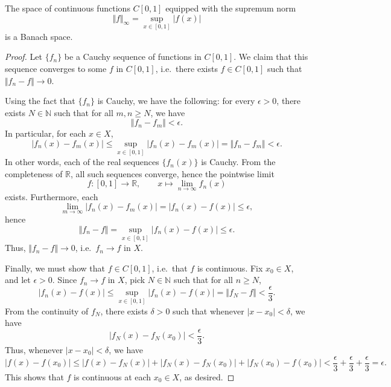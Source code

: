 \documentclass[11pt]{article}
\newcommand{\R}{\mathbb{R}}
\newcommand{\N}{\mathbb{N}}
\newcommand{\norm}[1]{\Vert #1 \Vert}
\theoremstyle{definition}
\theoremstyle{remark}
\begin{document}
    \begin{lemma}
        The space of continuous functions $C[0, 1]$ equipped with the supremum norm \[
            \norm{f}_\infty = \sup_{x \in [0, 1]} |f(x)|
        \] is a Banach space.
    \end{lemma}
    \begin{proof}
        Let $\{f_n\}$ be a Cauchy sequence of functions in $C[0, 1]$. We claim that
        this sequence converges to some $f$ in $C[0, 1]$, i.e.\ there exists $f \in
        C[0, 1]$ such that $\norm{f_n - f} \to 0$.

        Using the fact that $\{f_n\}$ is Cauchy, we have the following: for every
        $\epsilon > 0$, there exists $N \in \N$ such that for all $m, n \geq N$, we
        have \[
            \norm{f_n - f_m} < \epsilon.
        \] In particular, for each $x \in X$, \[
            |f_n(x) - f_m(x)| \leq \sup_{x \in [0, 1]} |f_n(x) - f_m(x)| = \norm{f_n
            - f_m} < \epsilon.
        \] In other words, each of the real sequences $\{f_n(x)\}$ is Cauchy. From
        the completeness of $\R$, all such sequences converge, hence the pointwise
        limit \[
            f\colon [0, 1] \to \R, \qquad x \mapsto \lim_{n \to \infty} f_n(x)
        \] exists. Furthermore, each \[
            \lim_{m \to \infty} |f_n(x) - f_m(x)| = |f_n(x) - f(x)| \leq \epsilon,
        \] hence \[
            \norm{f_n - f} = \sup_{x \in [0, 1]} |f_n(x) - f(x)| \leq \epsilon.
        \] Thus, $\norm{f_n - f} \to 0$, i.e.\ $f_n \to f$ in $X$.

        Finally, we must show that $f \in C[0, 1]$, i.e.\ that $f$ is continuous. Fix
        $x_0 \in X$, and let $\epsilon > 0$. Since $f_n \to f$ in $X$, pick $N \in
        \N$ such that for all $n \geq N$, \[
            |f_n(x) - f(x)| \leq \sup_{x \in [0, 1]} |f_n(x) - f(x)| = \norm{f_N - f}
            < \frac{\epsilon}{3}.
        \] From the continuity of $f_N$, there exists $\delta > 0$ such that whenever
        $|x - x_0| < \delta$, we have \[
            |f_N(x) - f_N(x_0)| < \frac{\epsilon}{3}.
        \] Thus, whenever $|x - x_0| < \delta$, we have \[
            |f(x) - f(x_0)| \leq |f(x) - f_N(x)| + |f_N(x) - f_N(x_0)| + |f_N(x_0) -
            f(x_0)| < \frac{\epsilon}{3} + \frac{\epsilon}{3} + \frac{\epsilon}{3} =
            \epsilon.
        \] This shows that $f$ is continuous at each $x_0 \in X$, as desired.
    \end{proof}
\end{document}
